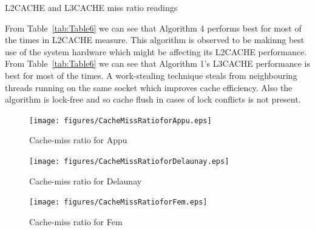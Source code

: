 \begin{itemize}
\begin{table}[th]
\caption{\capfont L2CACHE and L3CACHE miss ratio readings }
\label{tab:Table6}
\end{table}
From Table~\ref{tab:Table6} we can see that Algorithm 4 performs best
for most of the times in L2CACHE measure.  This algorithm is observed
to be makinng best use of the system hardware which might be affecting
its L2CACHE performance.
\newline
From Table~\ref{tab:Table6} we can see that
Algorithm 1's L3CACHE performance is best for most of the times.  A
work-stealing technique steals from neighbouring threads running on
the same socket which improves cache efficiency. Also the algorithm is
lock-free and so cache flush in cases of lock conflicts is not
present.
\begin{figure}[t]
    \centering
    \texttt{[image: figures/CacheMissRatioforAppu.eps]}
    \caption{Cache-miss ratio for Appu}
    \label{fig:Appu-Cache Miss}
\end{figure}

\begin{figure}[t]
    \centering
    \texttt{[image: figures/CacheMissRatioforDelaunay.eps]}
    \caption{Cache-miss ratio for Delaunay}
    \label{fig:Delaunay-Cache Miss}
\end{figure}

\begin{figure}[t]
    \centering
    \texttt{[image: figures/CacheMissRatioforFem.eps]}
    \caption{Cache-miss ratio for Fem}
    \label{fig:Fem-Cache Miss}
\end{figure}


\end{itemize}

